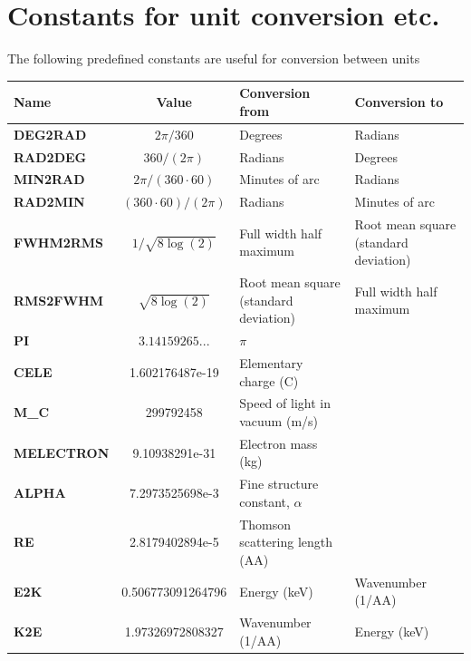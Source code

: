 \section{Constants for unit conversion etc.}
The following predefined constants are useful for conversion
between units
\def\textvb{\textbf}
\begin{center}
\begin{tabular}{|l|c|p{}|p{}|}
\hline
Name & Value & Conversion from & Conversion to \\ \hline
\textvb{DEG2RAD} & $2 \pi / 360$ & Degrees & Radians \\
\textvb{RAD2DEG} & $360 / (2 \pi)$ & Radians & Degrees \\
\textvb{MIN2RAD} & $2 \pi / (360 \cdot 60)$
  & Minutes of arc & Radians \\
\textvb{RAD2MIN} & $(360\cdot 60) / (2 \pi)$
  & Radians & Minutes of arc \\
\textvb{FWHM2RMS} & $1/\sqrt{8\log(2)}$
  & Full width half maximum & Root mean square (standard deviation) \\
\textvb{RMS2FWHM} & $\sqrt{8\log(2)}$
  & Root mean square (standard deviation) & Full width half maximum \\
\textvb{PI} & $3.14159265...$
  & $\pi$ & \\
\textvb{CELE} & 1.602176487e-19 & Elementary charge (C) &\\
\textvb{M\_C} & 299792458 & Speed of light in vacuum (m/s) &\\
\textvb{MELECTRON} & 9.10938291e-31 & Electron mass (kg) &\\
\textvb{ALPHA} & 7.2973525698e-3 & Fine structure constant, $\alpha$ &\\
\textvb{RE} & 2.8179402894e-5 &  Thomson scattering length (AA)&\\
\textvb{E2K} & 0.506773091264796 & Energy (keV) & Wavenumber (1/AA)\\
\textvb{K2E} & 1.97326972808327  & Wavenumber (1/AA) & Energy (keV)\\


\hline
\end{tabular}
\end{center}
